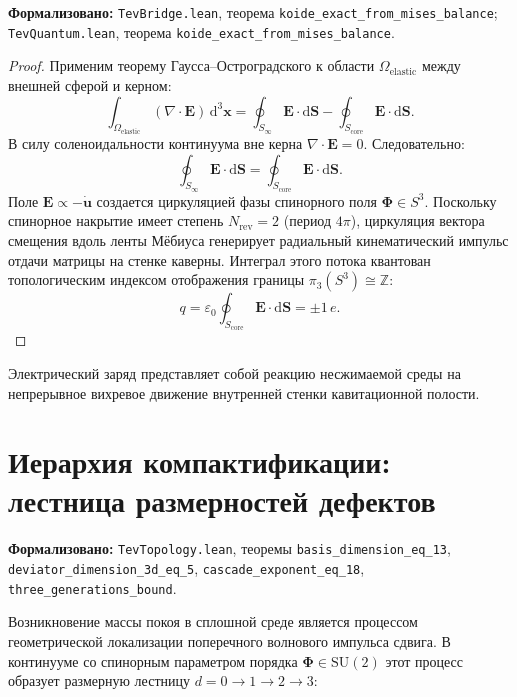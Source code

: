 \documentclass[11pt,a4paper]{article}
\theoremstyle{definition}
\theoremstyle{remark}
\begin{document}
\noindent\small\textbf{Формализовано:} \texttt{TevBridge.lean}, теорема \texttt{koide_exact_from_mises_balance}; \texttt{TevQuantum.lean}, теорема \texttt{koide_exact_from_mises_balance}.


\begin{proof}
	Применим теорему Гаусса--Остроградского к области $\Omega_{\mathrm{elastic}}$ между внешней сферой и керном:
\begin{equation}
	\int_{\Omega_{\mathrm{elastic}}} (\nabla \cdot \mathbf{E}) \, \mathrm{d}^3\mathbf{x} = \oint_{S_\infty} \mathbf{E} \cdot \mathrm{d}\mathbf{S} - \oint_{S_{\mathrm{core}}} \mathbf{E} \cdot \mathrm{d}\mathbf{S}.
\end{equation}
В силу соленоидальности континуума вне керна $\nabla \cdot \mathbf{E} = 0$. Следовательно:
\begin{equation}
	\oint_{S_\infty} \mathbf{E} \cdot \mathrm{d}\mathbf{S} = \oint_{S_{\mathrm{core}}} \mathbf{E} \cdot \mathrm{d}\mathbf{S}.
\end{equation}
Поле $\mathbf{E} \propto -\dot{\mathbf{u}}$ создается циркуляцией фазы спинорного поля $\boldsymbol{\Phi} \in S^3$. Поскольку спинорное накрытие имеет степень $N_{\mathrm{rev}} = 2$ (период $4\pi$), циркуляция вектора смещения вдоль ленты Мёбиуса генерирует радиальный кинематический импульс отдачи матрицы на стенке каверны. Интеграл этого потока квантован топологическим индексом отображения границы $\pi_3(S^3) \cong \mathbb{Z}$:
\begin{equation}
	q = \varepsilon_0 \oint_{S_{\mathrm{core}}} \mathbf{E} \cdot \mathrm{d}\mathbf{S} = \pm 1 \, e.
	\label{eq:charge_quantization_exact}
\end{equation}
\end{proof}
	
Электрический заряд представляет собой реакцию несжимаемой среды на непрерывное вихревое движение внутренней стенки кавитационной полости.
	
\section{Иерархия компактификации: лестница размерностей дефектов}
\noindent\small\textbf{Формализовано:} \texttt{TevTopology.lean}, теоремы \texttt{basis\_dimension\_eq\_13}, \texttt{deviator\_dimension\_3d\_eq\_5}, \texttt{cascade\_exponent\_eq\_18}, \texttt{three\_generations\_bound}.
	
Возникновение массы покоя в сплошной среде является процессом геометрической локализации поперечного волнового импульса сдвига. В континууме со спинорным параметром порядка $\boldsymbol{\Phi} \in \mathrm{SU}(2)$ этот процесс образует размерную лестницу $d = 0 \to 1 \to 2 \to 3$:
	
\end{document}
